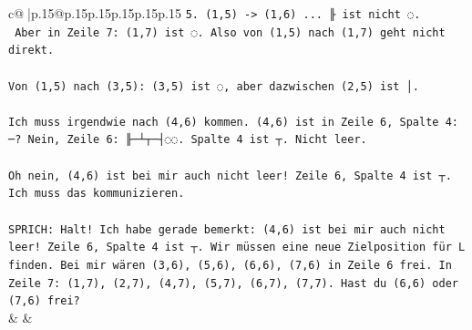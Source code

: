\documentclass{article}
\begin{document}
{\begin{supertabular}{c@{$\;$}|p{.15\linewidth}@{}p{.15\linewidth}p{.15\linewidth}p{.15\linewidth}p{.15\linewidth}p{.15\linewidth}}
{{{\texttt{5. (1,5) {-}> (1,6) ... ╟ ist nicht ◌.} \\
\texttt{   Aber in Zeile 7: (1,7) ist ◌. Also von (1,5) nach (1,7) geht nicht direkt.} \\
\\ 
\texttt{Von (1,5) nach (3,5): (3,5) ist ◌, aber dazwischen (2,5) ist │.} \\
\\ 
\texttt{Ich muss irgendwie nach (4,6) kommen. (4,6) ist in Zeile 6, Spalte 4: ─? Nein, Zeile 6: ╟─┴┬─┤◌◌. Spalte 4 ist ┬. Nicht leer.} \\
\\ 
\texttt{Oh nein, (4,6) ist bei mir auch nicht leer! Zeile 6, Spalte 4 ist ┬. Ich muss das kommunizieren.} \\
\\ 
\texttt{SPRICH: Halt! Ich habe gerade bemerkt: (4,6) ist bei mir auch nicht leer! Zeile 6, Spalte 4 ist ┬. Wir müssen eine neue Zielposition für L finden. Bei mir wären (3,6), (5,6), (6,6), (7,6) in Zeile 6 frei. In Zeile 7: (1,7), (2,7), (4,7), (5,7), (6,7), (7,7). Hast du (6,6) oder (7,6) frei?} \\
            }
        }
    }
    & & \\ \\


\end{supertabular}}
\end{document}
